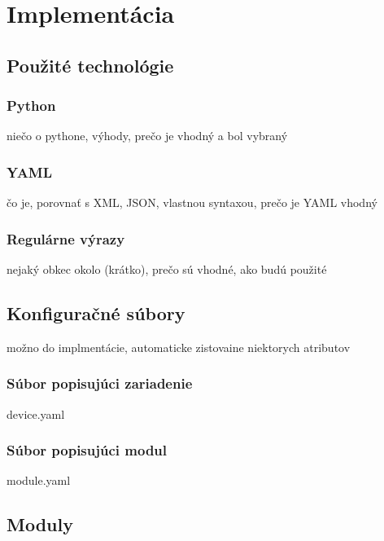 \chapter{Implementácia}

\section{Použité technológie}
 \subsection{Python}
 niečo o pythone, výhody, prečo je vhodný a bol vybraný
 \subsection{YAML}
 čo je, porovnať s XML, JSON, vlastnou syntaxou, prečo je YAML vhodný
 \subsection{Regulárne výrazy}
 nejaký obkec okolo (krátko), prečo sú vhodné, ako budú použité

\section{Konfiguračné súbory}
možno do implmentácie, automaticke zistovaine niektorych atributov
\subsection{Súbor popisujúci zariadenie}
device.yaml
\subsection{Súbor popisujúci modul}
module.yaml

\section{Moduly}


